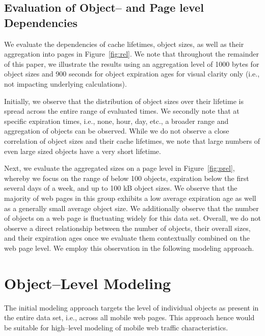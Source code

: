 \documentclass[letterpaper,conference]{IEEEtran}
\begin{document}
\subsection{Evaluation of Object-- and Page level Dependencies}
We evaluate the dependencies of cache lifetimes, object sizes, as well as their aggregation into pages in Figure~\ref{fig:rel}.
We note that throughout the remainder of this paper, we illustrate the results using an aggregation level of 1000 bytes for object sizes and 900 seconds for object expiration ages for visual clarity only (i.e., not impacting underlying calculations).

\begin{figure*}[b!]
	\centering
	\hfil
	\caption{Individual sizes and cache expirations for 197634 web objects as well as their averages when considering page--level relationships for 4776 mobile web landing pages.\label{fig:rel}}
\end{figure*}

Initially, we observe that the distribution of object sizes over their lifetime is spread across the entire range of evaluated times. 
We secondly note that at specific expiration times, i.e., none, hour, day, etc., a broader range and aggregation of objects can be observed. 
While we do not observe a close correlation of object sizes and their cache lifetimes, we note that large numbers of even large sized objects have a very short lifetime.

Next, we evaluate the aggregated sizes on a page level in Figure~\ref{fig:prel}, whereby we focus on the range of below 100 objects, expiration below the first several days of a week, and up to 100 kB object sizes.
We observe that the majority of web pages in this group exhibits a low average expiration age as well as a generally small average object size.
We additionally observe that the number of objects on a web page is fluctuating widely for this data set.
Overall, we do not observe a direct relationship between the number of objects, their overall sizes, and their expiration ages once we evaluate them contextually combined on the web page level.
We employ this observation in the following modeling approach.


\section{Object--Level Modeling}
\label{s:object}
The initial modeling approach targets the level of individual objects as present in the entire data set, i.e., across all mobile web pages. 
This approach hence would be suitable for high--level modeling of mobile web traffic characteristics.
\end{document}
